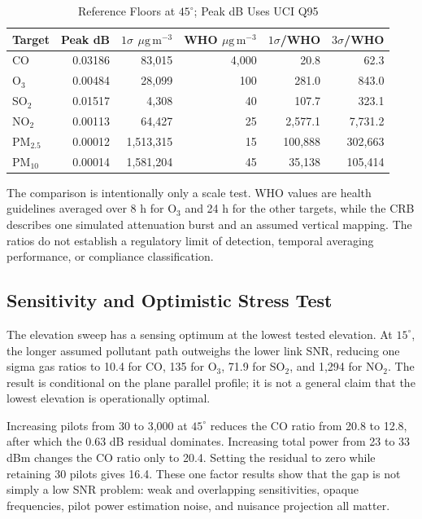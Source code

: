 \documentclass[conference]{IEEEtran}
\newcommand{\ugm}{\ensuremath{\mu\mathrm{g\,m}^{-3}}}
\newcommand{\pmfive}{PM$_{2.5}$}
\newcommand{\pmten}{PM$_{10}$}
\begin{document}
\begin{table}[t]
\caption{Reference Floors at $45^\circ$; Peak dB Uses UCI Q95}
\label{tab:floors}
\centering
\scriptsize
\setlength{\tabcolsep}{2.5pt}
\begin{tabular}{@{}lrrrrr@{}}
\toprule
Target & Peak dB & $1\sigma$ \ugm & WHO \ugm & $1\sigma$/WHO & $3\sigma$/WHO \\
\midrule
CO & 0.03186 & 83,015 & 4,000 & 20.8 & 62.3 \\
O$_3$ & 0.00484 & 28,099 & 100 & 281.0 & 843.0 \\
SO$_2$ & 0.01517 & 4,308 & 40 & 107.7 & 323.1 \\
NO$_2$ & 0.00113 & 64,427 & 25 & 2,577.1 & 7,731.2 \\
\pmfive & 0.00012 & 1,513,315 & 15 & 100,888 & 302,663 \\
\pmten & 0.00014 & 1,581,204 & 45 & 35,138 & 105,414 \\
\bottomrule
\end{tabular}
\end{table}

The comparison is intentionally only a scale test. WHO values are health guidelines averaged over 8 h for O$_3$ and 24 h for the other targets, while the CRB describes one simulated attenuation burst and an assumed vertical mapping. The ratios do not establish a regulatory limit of detection, temporal averaging performance, or compliance classification.

\subsection{Sensitivity and Optimistic Stress Test}

The elevation sweep has a sensing optimum at the lowest tested elevation. At $15^\circ$, the longer assumed pollutant path outweighs the lower link SNR, reducing one sigma gas ratios to 10.4 for CO, 135 for O$_3$, 71.9 for SO$_2$, and 1,294 for NO$_2$. The result is conditional on the plane parallel profile; it is not a general claim that the lowest elevation is operationally optimal.

Increasing pilots from 30 to 3,000 at $45^\circ$ reduces the CO ratio from 20.8 to 12.8, after which the 0.63 dB residual dominates. Increasing total power from 23 to 33 dBm changes the CO ratio only to 20.4. Setting the residual to zero while retaining 30 pilots gives 16.4. These one factor results show that the gap is not simply a low SNR problem: weak and overlapping sensitivities, opaque frequencies, pilot power estimation noise, and nuisance projection all matter.
\end{document}
